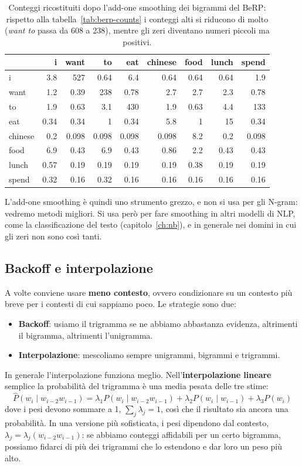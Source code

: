 \begin{table}[htbp]
\centering
\small
\begin{tabular}{l|rrrrrrrr}
\toprule
 & i & want & to & eat & chinese & food & lunch & spend \\
\midrule
i & 3.8 & 527 & 0.64 & 6.4 & 0.64 & 0.64 & 0.64 & 1.9 \\
want & 1.2 & 0.39 & 238 & 0.78 & 2.7 & 2.7 & 2.3 & 0.78 \\
to & 1.9 & 0.63 & 3.1 & 430 & 1.9 & 0.63 & 4.4 & 133 \\
eat & 0.34 & 0.34 & 1 & 0.34 & 5.8 & 1 & 15 & 0.34 \\
chinese & 0.2 & 0.098 & 0.098 & 0.098 & 0.098 & 8.2 & 0.2 & 0.098 \\
food & 6.9 & 0.43 & 6.9 & 0.43 & 0.86 & 2.2 & 0.43 & 0.43 \\
lunch & 0.57 & 0.19 & 0.19 & 0.19 & 0.19 & 0.38 & 0.19 & 0.19 \\
spend & 0.32 & 0.16 & 0.32 & 0.16 & 0.16 & 0.16 & 0.16 & 0.16 \\
\bottomrule
\end{tabular}
\caption{Conteggi ricostituiti dopo l'add-one smoothing dei bigrammi del BeRP: rispetto alla tabella~\ref{tab:berp-counts} i conteggi alti si riducono di molto (\textit{want to} passa da 608 a 238), mentre gli zeri diventano numeri piccoli ma positivi.}
\label{tab:berp-recon}
\end{table}

L'add-one smoothing è quindi uno strumento grezzo, e non si usa per gli N-gram: vedremo metodi migliori. Si usa però per fare smoothing in altri modelli di NLP, come la classificazione del testo (capitolo~\ref{ch:nb}), e in generale nei domini in cui gli zeri non sono così tanti.

\subsection{Backoff e interpolazione}
A volte conviene usare \textbf{meno contesto}, ovvero condizionare su un contesto più breve per i contesti di cui sappiamo poco. Le strategie sono due:
\begin{itemize}
    \item \textbf{Backoff}: usiamo il trigramma se ne abbiamo abbastanza evidenza, altrimenti il bigramma, altrimenti l'unigramma.
    \item \textbf{Interpolazione}: mescoliamo sempre unigrammi, bigrammi e trigrammi.
\end{itemize}
In generale l'interpolazione funziona meglio. Nell'\textbf{interpolazione lineare} semplice la probabilità del trigramma è una media pesata delle tre stime:
\begin{equation}
\hat{P}(w_i \mid w_{i-2} w_{i-1}) = \lambda_1 P(w_i \mid w_{i-2} w_{i-1}) + \lambda_2 P(w_i \mid w_{i-1}) + \lambda_3 P(w_i)
\end{equation}
dove i pesi devono sommare a 1, $\sum_j \lambda_j = 1$, così che il risultato sia ancora una probabilità. In una versione più sofisticata, i pesi dipendono dal contesto, $\lambda_j = \lambda_j(w_{i-2} w_{i-1})$: se abbiamo conteggi affidabili per un certo bigramma, possiamo fidarci di più dei trigrammi che lo estendono e dar loro un peso più alto.

